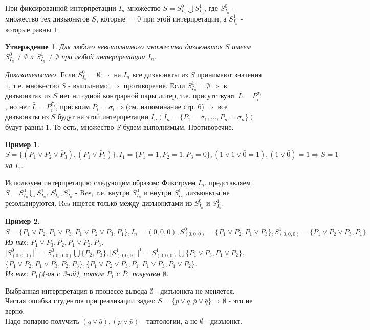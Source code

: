 \documentclass{article}
\newtheorem{example}{Пример}
\newtheorem{proposition}{Утверждение}
\numberwithin{example}{section}
\numberwithin{question}{section}
\numberwithin{Remark}{section}
\numberwithin{theorem}{section}
\numberwithin{definition}{section}
\numberwithin{proposition}{section}
\begin{document}
При фиксированной интерпретации $I_n$ множество $S=S_{I_n}^0\bigcup S_{I_n}^1$, где $S_{I_n}^0$ - множество тех дизъюнктов $S$, которые $=0$ при этой интерпретации, а $S_{I_n}^1$ - которые равны $1$.
\begin{proposition}
	Для любого невыполнимого множества дизъюнктов $S$ имеем $S_{I_n}^0\ne \emptyset$ и $S_{I_n}^1\ne \emptyset$ при любой интерпретации $I_n$.
\end{proposition}
\emph{Доказательство.} Если $S_{I_n}^0=\emptyset\Rightarrow$ на $I_n$ все дизъюнкты из $S$ принимают значения $1$, т.е. множество $S$ - выполнимо $\Rightarrow$ противоречие. Если $S_{I_n}^1=\emptyset\Rightarrow$ в дизъюнктах из $S$ нет ни одной \underline{контрарной пары} литер, т.е. присутствуют $L=P_i^{\sigma_i}$, но нет $\bar{L}=P_i^{\bar{\sigma}_i}$, присвоим $P_i=\sigma_i\Rightarrow$(см. напоминание стр. 6)$\Rightarrow$ все дизъюнкты из $S$ будут на этой интерпретации $I_n(I_n=\{P_1=\sigma_1,\ldots,P_n=\sigma_n \})$ будут равны $1$. То есть, множество $S$ будем выполнимым. Противоречие.
\begin{example}
	$S=\{(P_1\vee P_2\vee \bar{P}_3),(P_1\vee \bar{P}_3) \},I_1=\{P_1=1,P_2=1,P_3=0 \},(1\vee 1\vee \bar{0}=1),(1\vee \bar{0})=1\Rightarrow S=1$ на $I_1$. 
\end{example}
Используем интерпретацию следующим образом: Фикструем $I_n$, представляем $S=S_{I_n}^0\bigcup S_{I_n}^1$. $S_{I_n}^0,S_{I_n}^1$ - $\mathrm{Res}$, т.е. внутри $S_{I_n}^0$ и внутри $S_{I_n}^1$ дизъюнкты не резольвируются. $\mathrm{Res}$ ищется только между дизъюнктами из $S_{I_n}^0$ и $S_{I_n}^1$.
\begin{example}
	$S=\{ P_1\vee P_2,P_1\vee P_3,P_1\vee \bar{P}_2\vee\bar{P}_3,\bar{P}_1 \},I_n=(0,0,0),S_{(0,0,0)}^0=\{P_1\vee P_2,P_1\vee P_3 \},S_{(0,0,0)}^1=\{P_1\vee \bar{P}_2\vee \bar{P}_3,\bar{P}_1 \}$ \\
	Из них: $P_1\vee\bar{P_3},P_2,P_1\vee \bar{P}_2,P_3$. $\big[ S^0_{(0,0,0)}\big]^1=S^0_{(0,0,0)}\bigcup \{P_2,P_3 \},\big[ S^1_{(0,0,0)}\big]^1=S^1_{(0,0,0)}\bigcup \{P_1\vee \bar{P}_3,P_1\vee \bar{P}_2 \}$.\\
	$\{P_1\vee P_2,P_1\vee P_3,P_2,P_3\},\{ P_1\vee \bar{P}_2\vee \bar{P}_3,\bar{P}_1 ,P_1\vee \bar{P}_3,P_1\vee \bar{P}_2\}$.\\
	Из них: $P_1$(4-ая с 3-ой), потом $P_1$ с $\bar{P}_1$ получаем $\emptyset$.
\end{example}
Выбранная интерпретация в процессе вывода $\emptyset$ - дизъюнкта не меняется.\\
Частая ошибка студентов при реализации задач: $S=\{p\vee q,\bar{p}\vee\bar{q} \}\Rightarrow \emptyset$ - это не верно.\\
Надо попарно получить $(q\vee \bar{q}),(p\vee\bar{p})$ - тавтологии, а не $\emptyset$ - дизъюнкт.
\end{document}
